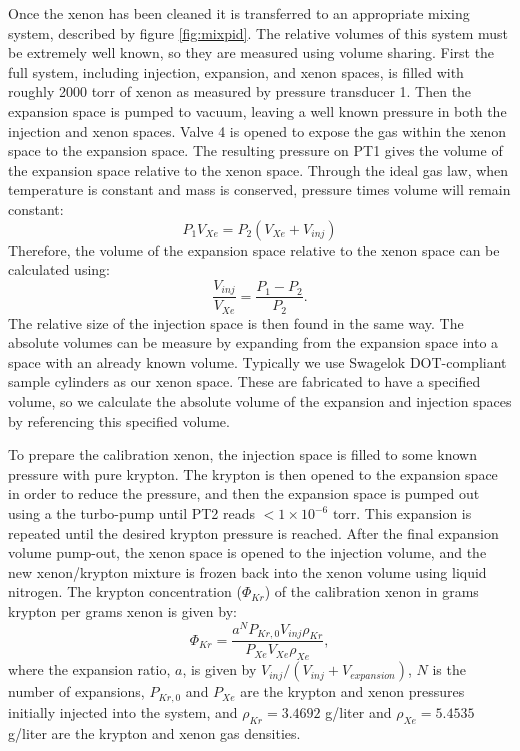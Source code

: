 \documentclass[12pt]{article}
\begin{document}
Once the xenon has been cleaned it is transferred to an appropriate mixing system, described by figure \ref{fig:mixpid}. The relative volumes of this system must be extremely well known, so they are measured using volume sharing. First the full system, including injection, expansion, and xenon spaces, is filled with roughly 2000 torr of xenon as measured by pressure transducer 1. Then the expansion space is pumped to vacuum, leaving a well known pressure in both the injection and xenon spaces. Valve 4 is opened to expose the gas within the xenon space to the expansion space. The resulting pressure on PT1 gives the volume of the expansion space relative to the xenon space. Through the ideal gas law, when temperature is constant and mass is conserved, pressure times volume will remain constant:
\begin{equation}
P_{1}V_{Xe} = P_{2}(V_{Xe}+V_{inj})
\end{equation}
Therefore, the volume of the expansion space relative to the xenon space can be calculated using:
\begin{equation}
\frac{V_{inj}}{V_{Xe}} = \frac{P_{1}-P_{2}}{P_{2}}.
\end{equation}
The relative size of the injection space is then found in the same way. The absolute volumes can be measure by expanding from the expansion space into a space with an already known volume. Typically we use Swagelok DOT-compliant sample cylinders as our xenon space. These are fabricated to have a specified volume, so we calculate the absolute volume of the expansion and injection spaces by referencing this specified volume.

To prepare the calibration xenon, the injection space is filled to some known pressure with pure krypton. The krypton is then opened to the expansion space in order to reduce the pressure, and then the expansion space is pumped out using a the turbo-pump until PT2 reads $<1\times10^{-6} \textrm{ torr}$. This expansion is repeated until the desired krypton pressure is reached. After the final expansion volume pump-out, the xenon space is opened to the injection volume, and the new xenon/krypton mixture is frozen back into the xenon volume using liquid nitrogen. The krypton concentration ($\Phi_{Kr}$) of the calibration xenon in grams krypton per grams xenon is given by:
\begin{equation}
\Phi_{Kr} = \frac{a^{N}P_{Kr,0}V_{inj}\rho_{Kr} }{P_{Xe}V_{Xe}\rho_{Xe}},
\end{equation}
where the expansion ratio, $a$, is given by $V_{inj}/(V_{inj}+V_{expansion})$, $N$ is the number of expansions, $P_{Kr,0}$ and $P_{Xe}$ are the krypton and xenon pressures initially injected into the system, and $\rho_{Kr}=3.4692$ g/liter and $\rho_{Xe}=5.4535$ g/liter are the krypton and xenon gas densities.\cite{nist} 
\end{document}

